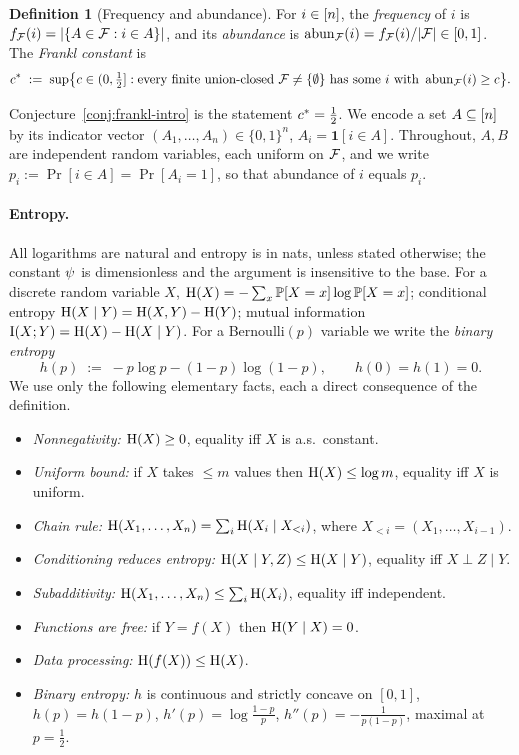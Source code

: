 \documentclass[11pt]{amsart}
\theoremstyle{definition}
\newtheorem{definition}[theorem]{Definition}
\theoremstyle{remark}
\begin{document}
\begin{definition}[Frequency and abundance]\label{def:abun}
For $i\in[n]$, the \emph{frequency} of $i$ is
$f_{\mathcal{F}}(i)=|\{A\in\mathcal{F}: i\in A\}|$, and its \emph{abundance} is
$\operatorname{abun}_{\mathcal{F}}(i)=f_{\mathcal{F}}(i)/|\mathcal{F}|\in[0,1]$. The \emph{Frankl constant} is
\[
   c^{\ast} \;:=\; \sup\bigl\{c\in(0,\tfrac12] : \text{every finite union-closed }
   \mathcal{F}\neq\{\emptyset\}\text{ has some }i\text{ with }\operatorname{abun}_{\mathcal{F}}(i)\ge c\bigr\}.
\]
\end{definition}

Conjecture~\ref{conj:frankl-intro} is the statement $c^{\ast}=\tfrac{1}{2}$. We encode a
set $A\subseteq[n]$ by its indicator vector $(A_1,\dots,A_n)\in\{0,1\}^n$,
$A_i=\mathbf 1[i\in A]$. Throughout, $A,B$ are independent random variables, each
uniform on $\mathcal{F}$, and we write $p_i:=\Pr[i\in A]=\Pr[A_i=1]$, so that abundance of
$i$ equals $p_i$.

\paragraph{Entropy.}
All logarithms are natural and entropy is in nats, unless stated otherwise; the
constant $\psi$ is dimensionless and the argument is insensitive to the base.
For a discrete random variable $X$,
$\operatorname{H}(X)=-\sum_x\mathbb{P}[X=x]\log\mathbb{P}[X=x]$; conditional entropy
$\operatorname{H}(X\mid Y)=\operatorname{H}(X,Y)-\operatorname{H}(Y)$; mutual information
$\operatorname{I}(X;Y)=\operatorname{H}(X)-\operatorname{H}(X\mid Y)$. For a Bernoulli$(p)$ variable we write the
\emph{binary entropy}
\[
   h(p) \;:=\; -p\log p-(1-p)\log(1-p),\qquad h(0)=h(1)=0 .
\]
We use only the following elementary facts, each a direct consequence of the
definition.

\begin{itemize}[leftmargin=2.4em]
\item[\textbf{(E1)}] \emph{Nonnegativity:} $\operatorname{H}(X)\ge 0$, equality iff $X$ is a.s.\ constant.
\item[\textbf{(E2)}] \emph{Uniform bound:} if $X$ takes $\le m$ values then $\operatorname{H}(X)\le\log m$, equality iff $X$ is uniform.
\item[\textbf{(E3)}] \emph{Chain rule:} $\operatorname{H}(X_1,\dots,X_n)=\sum_i \operatorname{H}(X_i\mid X_{<i})$, where $X_{<i}=(X_1,\dots,X_{i-1})$.
\item[\textbf{(E4)}] \emph{Conditioning reduces entropy:} $\operatorname{H}(X\mid Y,Z)\le\operatorname{H}(X\mid Y)$, equality iff $X\perp Z\mid Y$.
\item[\textbf{(E5)}] \emph{Subadditivity:} $\operatorname{H}(X_1,\dots,X_n)\le\sum_i\operatorname{H}(X_i)$, equality iff independent.
\item[\textbf{(E6)}] \emph{Functions are free:} if $Y=f(X)$ then $\operatorname{H}(Y\mid X)=0$.
\item[\textbf{(E7)}] \emph{Data processing:} $\operatorname{H}(f(X))\le\operatorname{H}(X)$.
\item[\textbf{(E8)}] \emph{Binary entropy:} $h$ is continuous and strictly concave on $[0,1]$, $h(p)=h(1-p)$, $h'(p)=\log\frac{1-p}{p}$, $h''(p)=-\tfrac{1}{p(1-p)}$, maximal at $p=\tfrac12$.
\end{itemize}
\end{document}
